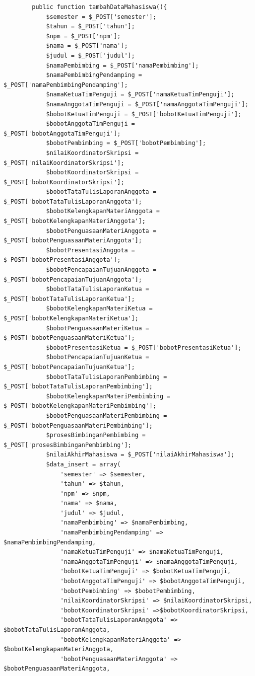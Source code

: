 \begin{lstlisting}
		public function tambahDataMahasiswa(){
			$semester = $_POST['semester'];
			$tahun = $_POST['tahun'];
			$npm = $_POST['npm'];
			$nama = $_POST['nama'];
			$judul = $_POST['judul'];
			$namaPembimbing = $_POST['namaPembimbing'];
			$namaPembimbingPendamping = $_POST['namaPembimbingPendamping'];
			$namaKetuaTimPenguji = $_POST['namaKetuaTimPenguji'];
			$namaAnggotaTimPenguji = $_POST['namaAnggotaTimPenguji'];
			$bobotKetuaTimPenguji = $_POST['bobotKetuaTimPenguji'];
			$bobotAnggotaTimPenguji = $_POST['bobotAnggotaTimPenguji'];
			$bobotPembimbing = $_POST['bobotPembimbing'];
			$nilaiKoordinatorSkripsi = $_POST['nilaiKoordinatorSkripsi'];
			$bobotKoordinatorSkripsi = $_POST['bobotKoordinatorSkripsi'];
			$bobotTataTulisLaporanAnggota = $_POST['bobotTataTulisLaporanAnggota'];
			$bobotKelengkapanMateriAnggota = $_POST['bobotKelengkapanMateriAnggota'];
			$bobotPenguasaanMateriAnggota = $_POST['bobotPenguasaanMateriAnggota'];
			$bobotPresentasiAnggota = $_POST['bobotPresentasiAnggota'];
			$bobotPencapaianTujuanAnggota = $_POST['bobotPencapaianTujuanAnggota'];
			$bobotTataTulisLaporanKetua = $_POST['bobotTataTulisLaporanKetua'];
			$bobotKelengkapanMateriKetua = $_POST['bobotKelengkapanMateriKetua'];
			$bobotPenguasaanMateriKetua = $_POST['bobotPenguasaanMateriKetua'];
			$bobotPresentasiKetua = $_POST['bobotPresentasiKetua'];
			$bobotPencapaianTujuanKetua = $_POST['bobotPencapaianTujuanKetua'];
			$bobotTataTulisLaporanPembimbing = $_POST['bobotTataTulisLaporanPembimbing'];
			$bobotKelengkapanMateriPembimbing = $_POST['bobotKelengkapanMateriPembimbing'];
			$bobotPenguasaanMateriPembimbing = $_POST['bobotPenguasaanMateriPembimbing'];
			$prosesBimbinganPembimbing = $_POST['prosesBimbinganPembimbing'];
			$nilaiAkhirMahasiswa = $_POST['nilaiAkhirMahasiswa'];
			$data_insert = array(
				'semester' => $semester,
				'tahun' => $tahun,
				'npm' => $npm,
				'nama' => $nama,
				'judul' => $judul,
				'namaPembimbing' => $namaPembimbing,
				'namaPembimbingPendamping' => $namaPembimbingPendamping,
				'namaKetuaTimPenguji' => $namaKetuaTimPenguji,
				'namaAnggotaTimPenguji' => $namaAnggotaTimPenguji,
				'bobotKetuaTimPenguji' => $bobotKetuaTimPenguji,
				'bobotAnggotaTimPenguji' => $bobotAnggotaTimPenguji,
				'bobotPembimbing' => $bobotPembimbing,
				'nilaiKoordinatorSkripsi' => $nilaiKoordinatorSkripsi,
				'bobotKoordinatorSkripsi' =>$bobotKoordinatorSkripsi,
				'bobotTataTulisLaporanAnggota' => $bobotTataTulisLaporanAnggota,
				'bobotKelengkapanMateriAnggota' => $bobotKelengkapanMateriAnggota,
				'bobotPenguasaanMateriAnggota' => $bobotPenguasaanMateriAnggota,

\end{lstlisting}
